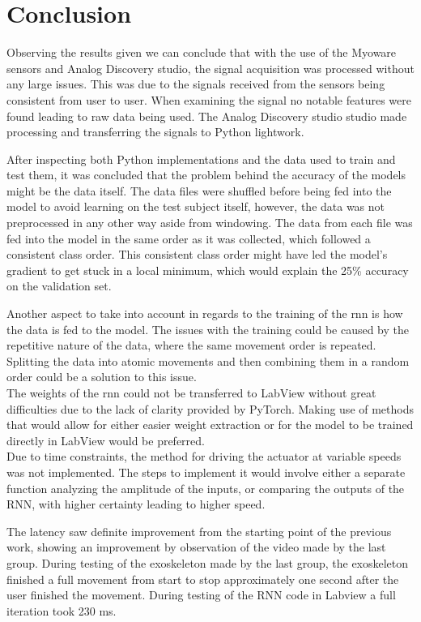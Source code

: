 \section{Conclusion}
Observing the results given we can conclude that with the use of the Myoware sensors and Analog Discovery studio, the signal 
acquisition was processed without any large issues. This was due to the signals received from the sensors being consistent 
from user to user. When examining the signal no notable features were found leading to raw data being used.
The Analog Discovery studio studio made processing and transferring the signals to Python lightwork.


After inspecting both Python implementations and the data used to train and test them, it was concluded that the problem behind the accuracy
of the models might be the data itself. The data files were shuffled before being fed into the model to avoid learning on the test subject
itself, however, the data was not preprocessed in any other way aside from windowing. The data from each file was fed into the model in the 
same order as it was collected, which followed a consistent class order. This consistent class order might have led the model's gradient to 
get stuck in a local minimum, which would explain the 25\% accuracy on the validation set.

Another aspect to take into account in regards to the training of the \acrshort{rnn} is how the data is fed to the model. The issues
with the training could be caused by the repetitive nature of the data, where the same movement order is repeated. Splitting the data
into atomic movements and then combining them in a random order could be a solution to this issue.
\\

The weights of the \acrshort{rnn} could not be transferred to LabView without great difficulties due to the lack of clarity provided by
PyTorch. Making use of methods that would allow for either easier weight extraction or for the model to be trained
directly in LabView would be preferred.
\\

Due to time constraints, the method for driving the actuator at variable speeds was not implemented. The steps to implement it
would involve either a separate function analyzing the amplitude of the inputs, or comparing the outputs of the RNN,
with higher certainty leading to higher speed.


The latency saw definite improvement from the starting point of the previous work, showing an improvement by observation of the video made by the last group. During testing of the exoskeleton made by the last group,
the exoskeleton finished a full movement from start to stop approximately one second after the user finished the movement. During testing of the RNN code in Labview a full iteration took 230 ms.


